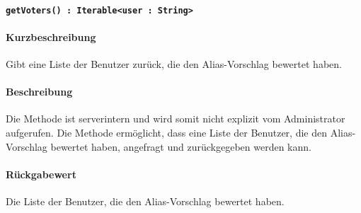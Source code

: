 \paragraph*{\texttt{getVoters() : Iterable<user : String>}}%
\paragraph*{Kurzbeschreibung}
Gibt eine Liste der Benutzer zurück, die den Alias-Vorschlag bewertet haben.
\paragraph*{Beschreibung}
Die Methode ist serverintern und wird somit nicht explizit vom Administrator aufgerufen.
Die Methode ermöglicht, dass eine Liste der Benutzer, die den Alias-Vorschlag bewertet haben, angefragt und zurückgegeben werden kann.
\paragraph*{Rückgabewert}
Die Liste der Benutzer, die den Alias-Vorschlag bewertet haben.
